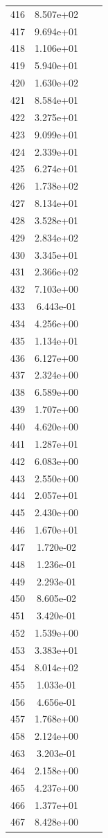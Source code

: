 \documentclass[12pt]{article}
\begin{document}
\begin{longtable}{@{}cccc@{}}
416 & 8.507e+02 &  &  \\
417 & 9.694e+01 &  &  \\
418 & 1.106e+01 &  &  \\
419 & 5.940e+01 &  &  \\
420 & 1.630e+02 &  &  \\
421 & 8.584e+01 &  &  \\
422 & 3.275e+01 &  &  \\
423 & 9.099e+01 &  &  \\
424 & 2.339e+01 &  &  \\
425 & 6.274e+01 &  &  \\
426 & 1.738e+02 &  &  \\
427 & 8.134e+01 &  &  \\
428 & 3.528e+01 &  &  \\
429 & 2.834e+02 &  &  \\
430 & 3.345e+01 &  &  \\
431 & 2.366e+02 &  &  \\
432 & 7.103e+00 &  &  \\
433 & 6.443e-01 &  &  \\
434 & 4.256e+00 &  &  \\
435 & 1.134e+01 &  &  \\
436 & 6.127e+00 &  &  \\
437 & 2.324e+00 &  &  \\
438 & 6.589e+00 &  &  \\
439 & 1.707e+00 &  &  \\
440 & 4.620e+00 &  &  \\
441 & 1.287e+01 &  &  \\
442 & 6.083e+00 &  &  \\
443 & 2.550e+00 &  &  \\
444 & 2.057e+01 &  &  \\
445 & 2.430e+00 &  &  \\
446 & 1.670e+01 &  &  \\
447 & 1.720e-02 &  &  \\
448 & 1.236e-01 &  &  \\
449 & 2.293e-01 &  &  \\
450 & 8.605e-02 &  &  \\
451 & 3.420e-01 &  &  \\
452 & 1.539e+00 &  &  \\
453 & 3.383e+01 &  &  \\
454 & 8.014e+02 &  &  \\
455 & 1.033e-01 &  &  \\
456 & 4.656e-01 &  &  \\
457 & 1.768e+00 &  &  \\
458 & 2.124e+00 &  &  \\
463 & 3.203e-01 &  &  \\
464 & 2.158e+00 &  &  \\
465 & 4.237e+00 &  &  \\
466 & 1.377e+01 &  &  \\
467 & 8.428e+00 &  &  \\

\bottomrule
\end{longtable}
\end{document}
